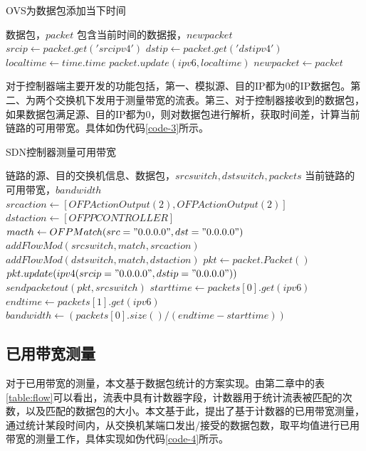 \begin{algorithm}[!htb]
    \caption{OVS为数据包添加当下时间}
    \label{code-2}
    \begin{algorithmic}[1] %
        \Require 数据包，$packet$
        \Ensure 包含当前时间的数据报，$newpacket$
        	\State $srcip \gets packet.get('srcipv4')$
        	\State $dstip \gets packet.get('dstipv4')$
        		\State $localtime \gets time.time$
        		\State $packet.update(ipv6, localtime)$
        	\EndIf
      		\State $newpacket \gets packet$
      		\State {}
        \EndFunction
    \end{algorithmic}
\end{algorithm}

对于控制器端主要开发的功能包括，第一、模拟源、目的IP都为0的IP数据包。第二、为两个交换机下发用于测量带宽的流表。第三、对于控制器接收到的数据包，如果数据包满足源、目的IP都为0，则对数据包进行解析，获取时间差，计算当前链路的可用带宽。具体如伪代码\ref{code-3}所示。

\begin{algorithm}[!htb]
    \caption{SDN控制器测量可用带宽}
    \label{code-3}
    \begin{algorithmic}[1] %
        \Require 链路的源、目的交换机信息、数据包，$srcswitch,dstswitch,packets$
        \Ensure 当前链路的可用带宽，$bandwidth$
        	\State $srcaction \gets [OFPActionOutput(2),OFPActionOutput(2)]$
        	\State $dstaction \gets [OFPPCONTROLLER]$
        	\State $macth \gets OFPMatch(src="0.0.0.0",dst="0.0.0.0")$
        	\State $addFlowMod(srcswitch,match,srcaction)$
        	\State $addFlowMod(dstswitch,match,dstaction)$
        \EndFunction
        	\State $pkt \gets packet.Packet()$
        	\State $pkt.update(ipv4(srcip="0.0.0.0",dstip="0.0.0.0"))$
        	\State $sendpacketout(pkt, srcswitch)$
        \EndFunction
         	\State $starttime \gets packets[0].get(ipv6)$
         	\State $endtime \gets packets[1].get(ipv6)$
         	\State $bandwidth \gets (packets[0].size()/(endtime-starttime))$
         	\State {}
        \EndFunction
    \end{algorithmic}
\end{algorithm}
\subsection{已用带宽测量}
对于已用带宽的测量，本文基于数据包统计的方案实现。由第二章中的表\ref{table:flow}可以看出，流表中具有计数器字段，计数器用于统计流表被匹配的次数，以及匹配的数据包的大小。本文基于此，提出了基于计数器的已用带宽测量，通过统计某段时间内，从交换机某端口发出/接受的数据包数，取平均值进行已用带宽的测量工作，具体实现如伪代码\ref{code-4}所示。

